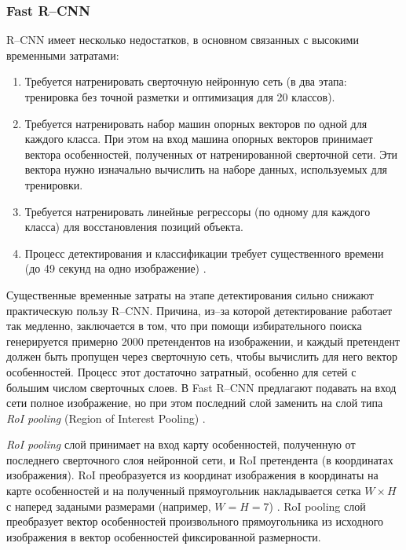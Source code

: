 \subsubsection{Fast R--CNN}

R--CNN имеет несколько недостатков, в основном связанных с высокими временными затратами:
\begin{enumerate}[leftmargin=1.6\parindent]
	\item Требуется натренировать сверточную нейронную сеть (в два этапа: тренировка без точной разметки и оптимизация для 20 классов).
	\item Требуется натренировать набор машин опорных векторов по одной для каждого класса. При этом на вход машина опорных векторов принимает вектора особенностей, полученных от натренированной сверточной сети. Эти вектора нужно изначально вычислить на наборе данных, используемых для тренировки.
	\item Требуется натренировать линейные регрессоры (по одному для каждого класса) для восстановления позиций объекта.
	\item Процесс детектирования и классификации требует существенного времени (до 49 секунд на одно изображение) \cite{fastrcnn}.
\end{enumerate}

Существенные временные затраты на этапе детектирования сильно снижают практическую пользу R--CNN. Причина, из--за которой детектирование работает так медленно, заключается в том, что при помощи избирательного поиска генерируется примерно 2000 претендентов на изображении, и каждый претендент должен быть пропущен через сверточную сеть, чтобы вычислить для него вектор особенностей. Процесс этот достаточно затратный, особенно для сетей с большим числом сверточных слоев. В Fast R--CNN предлагают подавать на вход сети полное изображение, но при этом последний слой заменить на слой типа \textit{RoI pooling} (Region of Interest Pooling) \cite{fastrcnn}.

\textit{RoI pooling} слой принимает на вход карту особенностей, полученную от последнего сверточного слоя нейронной сети, и RoI претендента (в координатах изображения). RoI преобразуется из координат изображения в координаты на карте особенностей и на полученный прямоугольник накладывается сетка $W \times H$ с наперед задаными размерами (например, $W = H = 7$) \cite{fastrcnn}. RoI pooling слой преобразует вектор особенностей произвольного прямоугольника из исходного изображения в вектор особенностей фиксированной размерности.

